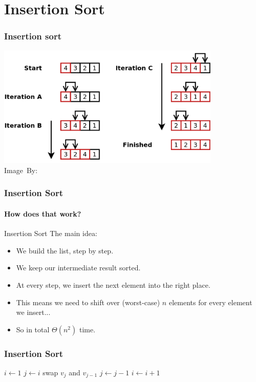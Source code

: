 \section{Insertion Sort}
\label{sec:insertion_sort}

\begin{frame}
	\frametitle{Insertion sort}
	\begin{center}
		\includegraphics[width=0.8\textwidth]{figures/insertionsort.png}\\
		\hspace*{15pt}\hbox{\scriptsize Image By:}
	\end{center}
\end{frame}

\begin{frame}
	\frametitle{Insertion Sort}
	\framesubtitle{How does that work?}
		\begin{block}{Insertion Sort}
			The main idea:
			\begin{itemize}
				\item We build the list, step by step.
					\pause
				\item We keep our intermediate result sorted.
					\pause
				\item At every step, we insert the next element into the right place.
					\pause
				\item This means we need to shift over (worst-case) $n$ elements for every element we insert...
					\pause
				\item So in total $\Theta(n^2)$ time.
			\end{itemize}
		\end{block}
\end{frame}

\begin{frame}
	\frametitle{Insertion Sort}
	\begin{algorithmic}
		\State $i \gets 1$ 
		\pause
		\State $j \gets i$
		\pause
			\State swap $v_j$ and $v_{j-1}$	
			\State $j \gets j -1$
		\EndWhile
		\pause
		\State $i \gets i+1$
		\EndWhile
	\end{algorithmic}
	\pause
	\begin{center}
	
	\end{center}
\end{frame}

